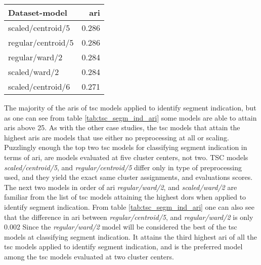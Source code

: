 \begin{table*}
    \centering
    \begin{tabular}{lr}
        \toprule
        Dataset-model     &  \acrshort{ari} \\
        \midrule
        scaled/centroid/5  & 0.286 \\
        regular/centroid/5 & 0.286 \\
        regular/ward/2     & 0.284 \\
        scaled/ward/2      & 0.284 \\
        scaled/centroid/6  & 0.271 \\
        \bottomrule
    \end{tabular}
    \caption{The five highest \acrshort{ari} scores attained when applying \acrshort{tsc} for detecting segmend indication.
             The \textbf{Dataset-model} column indicates \textit{Type of preprocessing used}$/$\textit{Linkage criteria of model}$/$\textit{Number of cluster centers}.}
    \label{tab:tsc_segm_ind_ari}
\end{table*}

The majority of the \acrshort{ari}s of \acrshort{tsc} models applied to identify segment indication, but as one can see from table \ref{tab:tsc_segm_ind_ari} some models are able to attain \acrshort{ari}s above 25. As with the other case studies, the \acrshort{tsc} models that attain the highest \acrshort{ari}s are models that use either no preprocessing at all or scaling. Puzzlingly enough the top two \acrshort{tsc} models for classifying segment indication in terms of \acrshort{ari}, are models evaluated at five cluster centers, not two. TSC models \textit{scaled/centroid/5}, and \textit{regular/centroid/5} differ only in type of preprocessing used, and they yield the exact same cluster assignments, and evaluations scores. The next two models in order of \acrshort{ari} \textit{regular/ward/2}, and \textit{scaled/ward/2} are familiar from the list of \acrshort{tsc} models attaining the highest \acrshort{dor}s when applied to identify segment indication. From table \ref{tab:tsc_segm_ind_ari} one can also see that the difference in \acrshort{ari} between \textit{regular/centroid/5}, and \textit{regular/ward/2} is only 0.002 Since the \textit{regular/ward/2} model will be considered the best of the \acrshort{tsc} models at classifying segment indication. It attains the third highest \acrshort{ari} of all the \acrshort{tsc} models applied to identify segment indication, and is the preferred model among the \acrshort{tsc} models evaluated at two cluster centers.

